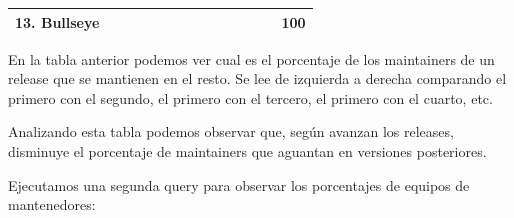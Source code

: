 \documentclass[a4paper, 12pt]{book}
\begin{document}
\begin{table}[htbp]
{\begin{tabular}{|l|l|l|l|l|l|l|l|l|l|l|l|l|l|}
				13. Bullseye & \cellcolor[HTML]{000000} & \cellcolor[HTML]{000000} & \cellcolor[HTML]{000000} & \cellcolor[HTML]{000000} & \cellcolor[HTML]{000000} & \cellcolor[HTML]{000000} & \cellcolor[HTML]{000000} & \cellcolor[HTML]{000000} & \cellcolor[HTML]{000000} & \cellcolor[HTML]{000000} & \cellcolor[HTML]{000000} & \cellcolor[HTML]{000000} & 100          \\ \hline
		\end{tabular}}
	\end{table}
	
	En la tabla anterior podemos ver cual es el porcentaje de los maintainers de un release que se mantienen en el resto. Se lee de izquierda a derecha comparando el primero con el segundo, el primero con el tercero, el primero con el cuarto, etc.
	
	Analizando esta tabla podemos observar que, según avanzan los releases, disminuye el porcentaje de maintainers que aguantan en versiones posteriores.
	
	Ejecutamos una segunda query para observar los porcentajes de equipos de mantenedores:
	
\end{document}
